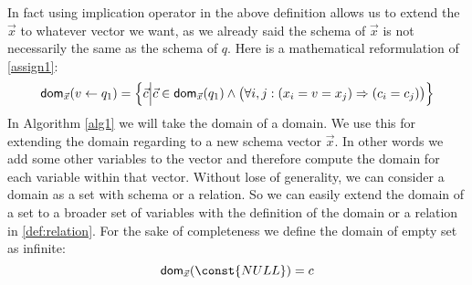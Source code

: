 \documentclass[12pt]{article}
\begin{document}
In fact using implication operator in the above definition allows us to extend the $\vec{x}$ to whatever vector we want, as we already said the schema of $\vec{x}$ is not necessarily the same as the schema of $q$. Here is a mathematical reformulation of \eqref{assign1}:
\begin{equation}
\label{assign2}
\text{\textsf{dom}{}}_{\vec{x}}(v\gets q_{1})=\Big\{\vec{c}\Big|\vec{c}\in\text{\textsf{dom}{}}_{\vec{x}}(q_{1})\land \big(\forall i,j: (x_{i}=v=x_{j})\Rightarrow(c_{i}=c_{j})\big)\Big\}
\end{equation}
In Algorithm \ref{alg1} we will take the domain of a domain. We use this for extending the domain regarding to a new schema vector $\vec x$. In other words we add some other variables to the vector and therefore compute the domain for each variable within that vector. Without lose of generality, we can consider a domain as a set with schema or a relation. So we can easily extend the domain of a set to a broader set of variables with the definition of the domain or a relation in \eqref{def:relation}. For the sake of completeness we define the domain of empty set as infinite:
\begin{equation}
\text{\dom}_{\vec{x}}(\const{NULL})={c}
\end{equation}
\end{document}

